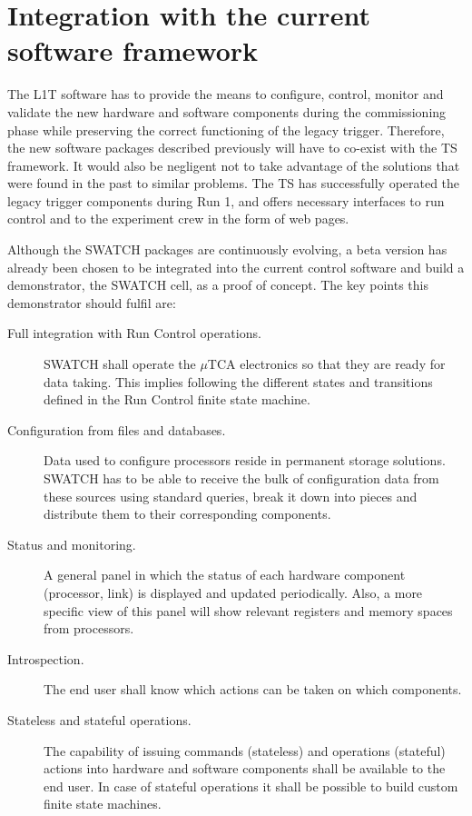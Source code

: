 \documentclass[a4paper]{jpconf}
\begin{document}
\section{Integration with the current software framework}

The L1T software has to provide the means to configure, control, monitor and validate the new hardware and software components during the commissioning phase while preserving the correct functioning of the legacy trigger. Therefore, the new software packages described previously will have to co-exist with the TS framework. It would also be negligent not to take advantage of the solutions that were found in the past to similar problems.  The TS has successfully operated the legacy trigger components during Run 1, and offers necessary interfaces to run control and to the experiment crew in the form of web pages. 

Although the SWATCH packages are continuously evolving, a beta version has already been chosen to be integrated into the current control software and build a demonstrator, the SWATCH cell, as a proof of concept. The key points this demonstrator should fulfil are:

\begin{description}
  \item[Full integration with Run Control operations.] SWATCH shall operate the $\mu$TCA electronics so that they are ready for data taking. This implies following the different states and transitions defined in the Run Control finite state machine. 
  \item[Configuration from files and databases.] Data used to configure processors reside in permanent storage solutions. SWATCH has to be able to receive the bulk of configuration data from these sources using standard queries, break it down into pieces and distribute them to their corresponding components.
  \item[Status and monitoring.] A general panel in which the status of each hardware component (processor, link) is displayed and updated periodically. Also, a more specific view of this panel will show relevant registers and memory spaces from processors. 
  \item[Introspection.] The end user shall know which actions can be taken on which components.
  \item[Stateless and stateful operations.] The capability of issuing commands (stateless) and operations (stateful) actions into hardware and software components shall be available to the end user. In case of stateful operations it shall be possible to build custom finite state machines. 
\end{description}
\end{document}
